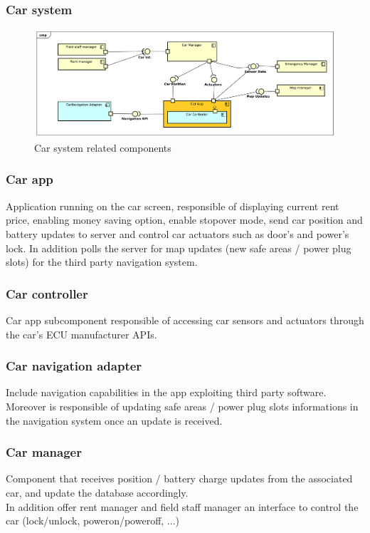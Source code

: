 \documentclass[english]{article}
\begin{document}
\clearpage
\subsubsection*{Car system}

	\begin{figure}[H]
		\centering
		\includegraphics[scale=0.35]{./ComponentDiagrams/Car.pdf}%
		\caption{Car system related components}
	\end{figure}

	\subsubsection{Car app}
	Application running on the car screen, responsible of displaying current rent price, enabling money saving option, enable stopover mode, send car position and battery updates to server and control car actuators such as door's and power's lock. In addition polls the server for map updates (new safe areas / power plug slots) for the third party navigation system. 
		\subsubsection{Car controller}
		Car app subcomponent responsible of accessing car sensors and actuators through the car's ECU manufacturer APIs.
		\subsubsection{Car navigation adapter}
		Include navigation capabilities in the app exploiting third party software. Moreover is responsible of updating safe areas / power plug slots informations in the navigation system once an update is received.
	\subsubsection{Car manager}
	Component that receives position / battery charge updates from the associated car, and update the database accordingly. \\In addition offer rent manager and field staff manager an interface to control the car (lock/unlock, poweron/poweroff, ...)
	
\end{document}
